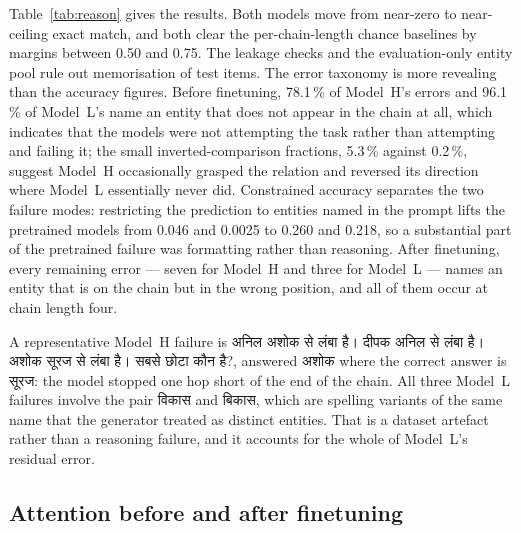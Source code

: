 \documentclass[10pt,a4paper]{article}
\newcommand{\dev}[1]{{\devanagarifont #1}}
\newcommand{\pc}[1]{#1\,\%}
\begin{document}
Table~\ref{tab:reason} gives the results. Both models move from near-zero to
near-ceiling exact match, and both clear the per-chain-length chance baselines by margins between 0.50 and 0.75. The leakage
checks and the evaluation-only entity pool rule out memorisation of test items.
The error taxonomy is more revealing than the accuracy figures. Before
finetuning, \pc{78.1} of Model~H's errors and \pc{96.1} of Model~L's name an
entity that does not appear in the chain at all, which indicates that the models
were not attempting the task rather than attempting and failing it; the small
inverted-comparison fractions, \pc{5.3} against \pc{0.2}, suggest Model~H
occasionally grasped the relation and reversed its direction where Model~L
essentially never did. Constrained accuracy separates the two failure modes:
restricting the prediction to entities named in the prompt lifts the pretrained
models from 0.046 and 0.0025 to 0.260 and 0.218, so a substantial part of the
pretrained failure was formatting rather than reasoning. After finetuning, every
remaining error --- seven for Model~H and three for Model~L --- names an entity
that is on the chain but in the wrong position, and all of them occur at chain
length four.

A representative Model~H failure is
\dev{अनिल अशोक से लंबा है। दीपक अनिल से लंबा है। अशोक सूरज से लंबा है। सबसे छोटा कौन है?},
answered \dev{अशोक} where the correct answer is \dev{सूरज}: the model stopped one
hop short of the end of the chain. All three Model~L failures involve the pair
\dev{विकास} and \dev{बिकास}, which are spelling variants of the same name that the
generator treated as distinct entities. That is a dataset artefact rather than a
reasoning failure, and it accounts for the whole of Model~L's residual error.

\subsection{Attention before and after finetuning}
\end{document}
